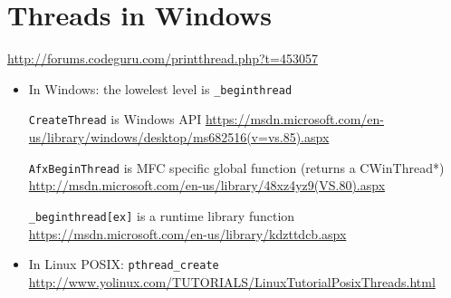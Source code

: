 \chapter{Threads in Windows}

\url{http://forums.codeguru.com/printthread.php?t=453057}

\begin{itemize}
  \item In Windows: the lowelest level is \verb!_beginthread! 
  
  \verb!CreateThread! is Windows API \url{https://msdn.microsoft.com/en-us/library/windows/desktop/ms682516(v=vs.85).aspx}
  
  \verb!AfxBeginThread! is MFC specific global function (returns a CWinThread*) \url{http://msdn.microsoft.com/en-us/library/48xz4yz9(VS.80).aspx}
  
  \verb!_beginthread[ex]! is a runtime library function \url{https://msdn.microsoft.com/en-us/library/kdzttdcb.aspx}
  
  \item In Linux POSIX: \verb!pthread_create! \url{http://www.yolinux.com/TUTORIALS/LinuxTutorialPosixThreads.html}
\end{itemize}